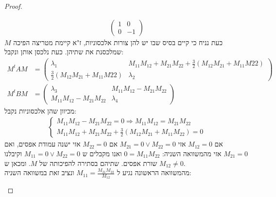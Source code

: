 \documentclass{article}
\begin{document}
\begin{proof}
\begin{enumerate}
\begin{align*}
\begin{pmatrix}
                    1 & 0 \\
                    0 & -1
                \end{pmatrix}
            \end{align*}
            כעת נניח כי קיים בסיס שבו יש להן צורות אלכסוניות, ז"א קיימת מטריצה הפיכה $M$ שמלכסנת את שתיהן.
            כעת נלכסן אותן ונקבל:
            \begin{align*}
                M^tAM &=
                \begin{pmatrix}
                    \lambda_1 & M_{11}M_{12} + M_{21}M_{22} + \frac{3}{2}(M_{12}M_{21} + M_{11}M{22}) \\
                    \frac{3}{2}(M_{12}M_{21} + M_{11}M{22}) & \lambda_2
                \end{pmatrix} \\
                M^tBM &=
                \begin{pmatrix}
                    \lambda_3 & M_{11}M_{12} - M_{21}M_{22} \\
                    M_{11}M_{12} - M_{21}M_{22} & \lambda_4
                \end{pmatrix}
            \end{align*}
            מכיוון שהן אלכסוניות נקבל:
            \begin{align*}
                \begin{cases}
                    M_{11}M_{12} - M_{21}M_{22} = 0
                    \Rightarrow M_{11}M_{12} = M_{21}M_{22} \\
                    M_{11}M_{12} + M_{21}M_{22} + \frac{3}{2}(M_{12}M_{21} + M_{11}M_{22})  = 0
                \end{cases}
            \end{align*}
            אם $M_{12} = 0$ אזי $M_{21} = 0 \lor M_{22} = 0$ אם $M_{22} = 0$ אזי ישנה עמודת אפסים,
            ואם $M_{21}=0$ אזי מהמשוואה השניה: $0 = M_{11}M_{22}$ ואנו מקבלים ש $M_{11} = 0 \lor M_{22} = 0$
            וקיבלנו שורת אפסים. שתיהם בסתירה להפיכותה של $M$. ומכאן ש $M_{12} \neq 0$. \\
            מהמשוואה הראשונה נגיע ל $M_{11} = \frac{M_{21}M_{22}}{M_{12}}$ ונציב זאת במשוואה השניה: \\


\end{enumerate}
\end{proof}
\end{document}
